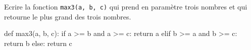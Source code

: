 \documentclass[11pt, a4paper]{report}
\begin{document}
    \begin{exercice_cours}

        \begin{minipage}{0.48\linewidth}
                Ecrire la fonction \verb|max3(a, b, c)| qui prend en paramètre trois nombres et qui retourne le plus grand des trois nombres.
\end{minipage}\hfill
    \begin{minipage}{0.48\linewidth}
\begin{blocvisible}[height=4.5]
    \begin{CodePythontexAlt}[TaillePolice=\large, Largeur=1\linewidth,Centre,Lignes=true,PremLigne=1]{}
def max3(a, b, c):
    if a >= b and a >= c:
        return a
    elif b >= a and b >= c:
        return b
    else:
        return c
    \end{CodePythontexAlt}
\end{blocvisible}

    \end{minipage}
    


    \end{exercice_cours}
        
\end{document}
